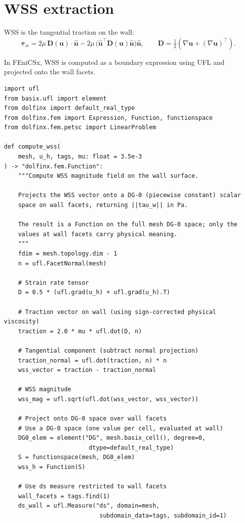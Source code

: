 \documentclass[11pt]{article}
\begin{document}
\section{WSS extraction}
\label{sec:wss}

WSS is the tangential traction on the wall:
\[
  \boldsymbol{\tau}_w
    = 2\mu\,\mathbf{D}(\mathbf{u})\cdot\hat{\mathbf{n}}
      - 2\mu\,\bigl(\hat{\mathbf{n}}^\top\mathbf{D}(\mathbf{u})\hat{\mathbf{n}}\bigr)\hat{\mathbf{n}},
  \qquad
  \mathbf{D} = \tfrac{1}{2}(\nabla\mathbf{u} + (\nabla\mathbf{u})^\top).
\]

In FEniCSx, WSS is computed as a boundary expression using UFL and
projected onto the wall facets.

\begin{lstlisting}
import ufl
from basix.ufl import element
from dolfinx import default_real_type
from dolfinx.fem import Expression, Function, functionspace
from dolfinx.fem.petsc import LinearProblem

def compute_wss(
    mesh, u_h, tags, mu: float = 3.5e-3
) -> "dolfinx.fem.Function":
    """Compute WSS magnitude field on the wall surface.

    Projects the WSS vector onto a DG-0 (piecewise constant) scalar
    space on wall facets, returning ||tau_w|| in Pa.

    The result is a Function on the full mesh DG-0 space; only the
    values at wall facets carry physical meaning.
    """
    fdim = mesh.topology.dim - 1
    n = ufl.FacetNormal(mesh)

    # Strain rate tensor
    D = 0.5 * (ufl.grad(u_h) + ufl.grad(u_h).T)

    # Traction vector on wall (using sign-corrected physical viscosity)
    traction = 2.0 * mu * ufl.dot(D, n)

    # Tangential component (subtract normal projection)
    traction_normal = ufl.dot(traction, n) * n
    wss_vector = traction - traction_normal

    # WSS magnitude
    wss_mag = ufl.sqrt(ufl.dot(wss_vector, wss_vector))

    # Project onto DG-0 space over wall facets
    # Use a DG-0 space (one value per cell, evaluated at wall)
    DG0_elem = element("DG", mesh.basix_cell(), degree=0,
                        dtype=default_real_type)
    S = functionspace(mesh, DG0_elem)
    wss_h = Function(S)

    # Use ds measure restricted to wall facets
    wall_facets = tags.find(1)
    ds_wall = ufl.Measure("ds", domain=mesh,
                           subdomain_data=tags, subdomain_id=1)


\end{lstlisting}
\end{document}
